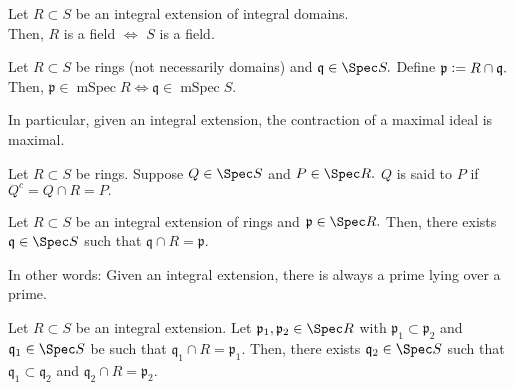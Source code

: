 \documentclass[12pt]{article}	%
\DeclareMathOperator{\mSpec}{mSpec}
\begin{document}
\begin{lem} 
	Let $R \subset S$ be an integral extension of integral domains. \\
	Then, $R$ is a field $\iff$ $S$ is a field.
\end{lem}

\begin{cor}
	Let $R \subset S$ be rings (not necessarily domains) and $\mathfrak{q} \in \Spec S.$ Define $\mathfrak{p} \vcentcolon= R \cap \mathfrak{q}.$ \\
	Then, $\mathfrak{p} \in \mSpec R \iff \mathfrak{q} \in \mSpec S.$

	In particular, given an integral extension, the contraction of a maximal ideal is maximal.
\end{cor}

\begin{defn}%
	Let $R \subset S$ be rings. Suppose $Q \in \Spec S$ and $P \in \Spec R.$ $Q$ is said to  $P$ if $Q^c = Q \cap R = P.$
\end{defn}

\begin{thm}
	Let $R \subset S$ be an integral extension of rings and $\mathfrak{p} \in \Spec R.$ Then, there exists $\mathfrak{q} \in \Spec S$ such that $\mathfrak{q} \cap R = \mathfrak{p}.$

	In other words: Given an integral extension, there is always a prime lying over a prime.
\end{thm}

\begin{thm}
	Let $R \subset S$ be an integral extension. Let $\mathfrak{p}_1, \mathfrak{p}_2 \in \Spec R$ with $\mathfrak{p}_1 \subset \mathfrak{p}_2$ and $\mathfrak{q}_1 \in \Spec S$ be such that $\mathfrak{q}_1 \cap R = \mathfrak{p}_1.$ Then, there exists $\mathfrak{q}_2 \in \Spec S$ such that $\mathfrak{q}_1 \subset \mathfrak{q}_2$ and $\mathfrak{q}_2 \cap R = \mathfrak{p}_2.$
\end{thm}
\begin{center}
\end{center}
\end{document}
